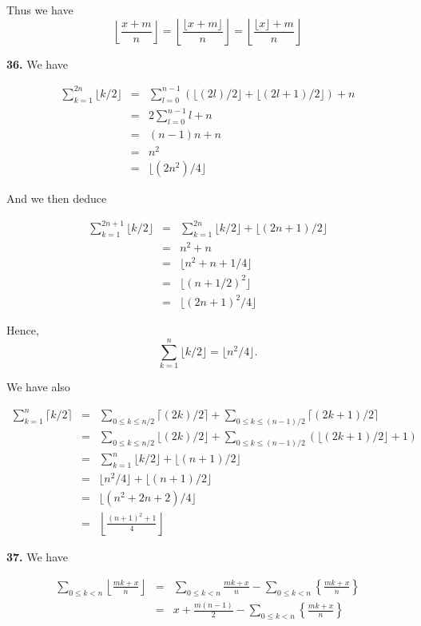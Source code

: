 \documentclass[a4paper,12pt]{article}
\newcommand{\newpar}[1]{\bigskip \noindent \textbf{#1.}}
\begin{document}
Thus we have
\[ \left\lfloor \frac{x+m}{n}\right\rfloor =
\left\lfloor \frac{\lfloor x+m\rfloor}{n}\right\rfloor =
\left\lfloor \frac{\lfloor x\rfloor + m}{n}\right\rfloor\]

\newpar{36} We have

\begin{eqnarray*}
  \sum_{k=1}^{2n} \lfloor k/2\rfloor &=& \sum_{l=0}^{n-1} (\lfloor (2l)/2
  \rfloor + \lfloor (2l+1)/2\rfloor) + n \\
  &=& 2 \sum_{l=0}^{n-1} l + n \\
  &=& (n-1)n + n \\
  &=& n^2 \\
  &=& \lfloor (2n^2)/4\rfloor
\end{eqnarray*}

And we then deduce

\begin{eqnarray*}
  \sum_{k=1}^{2n+1}\lfloor k/2\rfloor &=& \sum_{k=1}^{2n}\lfloor
  k/2\rfloor + \lfloor (2n+1)/2\rfloor \\
  &=& n^2 + n \\
  &=& \lfloor n^2 + n + 1/4\rfloor \\
  &=& \lfloor (n+1/2)^2\rfloor \\
  &=& \lfloor (2n+1)^2/4\rfloor
\end{eqnarray*}

Hence,
\[ \sum_{k=1}^n \lfloor k/2\rfloor = \lfloor n^2/4\rfloor.\]

We have also

\begin{eqnarray*}
  \sum_{k=1}^n \lceil k/2\rceil &=& \sum_{0\le k\le n/2} \lceil
  (2k)/2\rceil + \sum_{0\le k\le (n-1)/2} \lceil (2k+1)/2\rceil \\
  &=& \sum_{0\le k\le n/2}\lfloor (2k)/2\rfloor +
  \sum_{0\le k\le (n-1)/2}(\lfloor (2k+1)/2\rfloor + 1) \\
  &=& \sum_{k=1}^n \lfloor k/2\rfloor + \lfloor (n+1)/2\rfloor \\
  &=& \lfloor n^2/4\rfloor + \lfloor (n+1)/2\rfloor \\
  &=& \lfloor (n^2 + 2n + 2)/4\rfloor \\
  &=& \left\lfloor \frac{(n+1)^2+1}{4}\right\rfloor
\end{eqnarray*}

\newpar{37} We have

\begin{eqnarray*}
  \sum_{0\le k<n}\left\lfloor \frac{mk + x}{n}\right\rfloor &=&
  \sum_{0\le k<n}\frac{mk+x}{n} - \sum_{0\le k<n}\left\{
  \frac{mk+x}{n}\right\} \\ &=&
  x + \frac{m(n-1)}{2} - \sum_{0\le k<n}\left\{\frac{mk+x}{n}\right\}
\end{eqnarray*}
\end{document}
